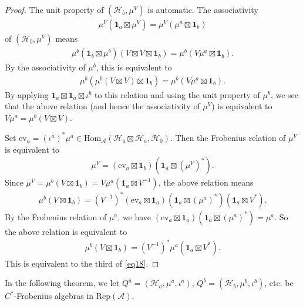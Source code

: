 \documentclass[11pt,b5paper,notitlepage]{article}
\theoremstyle{definition}
\theoremstyle{plain}
\newcommand{\mc}{\mathcal}
\newcommand{\id}{\mathbf{1}}
\newcommand{\Hom}{\mathrm{Hom}}
\newcommand{\ev}{\mathrm{ev}}
\newcommand{\RepA}{\mathrm{Rep}(\mathcal A)}
\numberwithin{equation}{section}
\begin{document}
\begin{proof}
The unit property of $(\mc H_b,\mu^V)$ is automatic. The associativity 
\begin{align*}
\mu^V(\id_a\boxtimes\mu^V)=\mu^V(\mu^a\boxtimes\id_b)	
\end{align*}
of $(\mc H_b,\mu^V)$ means
\begin{align*}
\mu^b(\id_b\boxtimes\mu^b)(V\boxtimes V\boxtimes\id_b)=	\mu^b(V\mu^a\boxtimes\id_b).
\end{align*}
By the associativity of $\mu^b$, this is equivalent to
\begin{align*}
	\mu^b(\mu^b(V\boxtimes V)\boxtimes\id_b)=	\mu^b(V\mu^a\boxtimes\id_b).
\end{align*}
By applying $\id_a\boxtimes\id_a\boxtimes\iota^b$ to this relation and using the unit property of $\mu^b$, we see that the above relation (and hence the associativity of $\mu^V$) is equivalent to $V\mu^a=\mu^b(V\boxtimes V)$.

Set $\ev_a=(\iota^a)^*\mu^a\in\Hom_{\mc A}(\mc H_a\boxtimes\mc H_a,\mc H_0)$. Then the Frobenius relation of $\mu^V$ is equivalent to
\begin{align*}
\mu^V=(\ev_a\boxtimes\id_b)(\id_a\boxtimes(\mu^V)^*).
\end{align*}
Since $\mu^V=\mu^b(V\boxtimes\id_b)=V\mu^a(\id_a\boxtimes V^{-1})$, the above relation means
\begin{align*}
\mu^b(V\boxtimes\id_b)=(V^{-1})^*(\ev_a\boxtimes\id_a)(\id_a\boxtimes(\mu^a)^*)(\id_a\boxtimes V^*).
\end{align*}
By the Frobenius relation of $\mu^a$, we have $(\ev_a\boxtimes\id_a)(\id_a\boxtimes(\mu^a)^*)=\mu^a$. So the above relation is equivalent to
\begin{align*}
\mu^b(V\boxtimes\id_b)=(V^{-1})^*\mu^a(\id_a\boxtimes V^*).
\end{align*}
This is equivalent to the third of \eqref{eq18}.
\end{proof}


In the following theorem, we let $Q^a=(\mc H_a,\mu^a,\iota^a)$, $Q^b=(\mc H_b,\mu^b,\iota^b)$, etc. be $C^*$-Frobenius algebras in $\RepA$.
\end{document}
